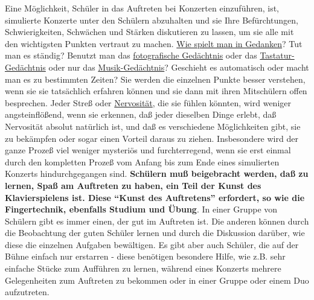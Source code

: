 Eine Möglichkeit, Schüler in das Auftreten bei Konzerten einzuführen, ist, simulierte Konzerte unter den Schülern abzuhalten und sie Ihre Befürchtungen, Schwierigkeiten, Schwächen und Stärken diskutieren zu lassen, um sie alle mit den wichtigsten Punkten vertraut zu machen.
\hyperref[c1ii12mental]{Wie spielt man in Gedanken}?
Tut man es ständig?
Benutzt man das \hyperref[c1iii6foto]{fotografische Gedächtnis} oder das \hyperref[c1iii6tastatur]{Tastatur-Gedächtnis} oder nur das \hyperref[c1iii6musik]{Musik-Gedächtnis}?
Geschieht es automatisch oder macht man es zu bestimmten Zeiten?
Sie werden die einzelnen Punkte besser verstehen, wenn sie sie tatsächlich erfahren können und sie dann mit ihren Mitschülern offen besprechen.
Jeder Streß oder \hyperref[c1iii15]{Nervosität}, die sie fühlen könnten, wird weniger angsteinflößend, wenn sie erkennen, daß jeder dieselben Dinge erlebt, daß Nervosität absolut natürlich ist, und daß es verschiedene Möglichkeiten gibt, sie zu bekämpfen oder sogar einen Vorteil daraus zu ziehen.
Insbesondere wird der ganze Prozeß viel weniger mysteriös und furchterregend, wenn sie erst einmal durch den kompletten Prozeß vom Anfang bis zum Ende eines simulierten Konzerts hindurchgegangen sind.
\textbf{Schülern muß beigebracht werden, daß zu lernen, Spaß am Auftreten zu haben, ein Teil der Kunst des Klavierspielens ist.
Diese \enquote{Kunst des Auftretens} erfordert, so wie die Fingertechnik, ebenfalls Studium und Übung}.
In einer Gruppe von Schülern gibt es immer einen, der gut im Auftreten ist.
Die anderen können durch die Beobachtung der guten Schüler lernen und durch die Diskussion darüber, wie diese die einzelnen Aufgaben bewältigen.
Es gibt aber auch Schüler, die auf der Bühne einfach nur erstarren - diese benötigen besondere Hilfe, wie z.B. sehr einfache Stücke zum Aufführen zu lernen, während eines Konzerts mehrere Gelegenheiten zum Auftreten zu bekommen oder in einer Gruppe oder einem Duo aufzutreten.

